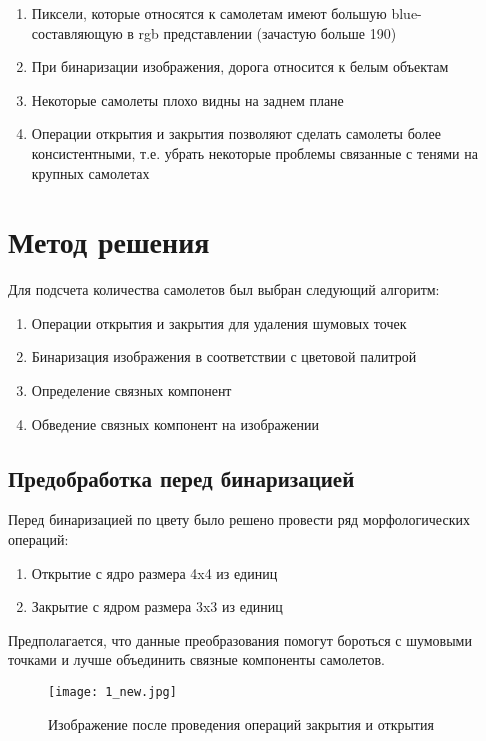 \documentclass{article}
\begin{document}
\begin{enumerate}
    \item Пиксели, которые относятся к самолетам имеют большую blue-составляющую в rgb представлении (зачастую больше 190)
    \item При бинаризации изображения, дорога относится к белым объектам
    \item Некоторые самолеты плохо видны на заднем плане
    \item Операции открытия и закрытия позволяют сделать самолеты более консистентными, т.е. убрать некоторые проблемы связанные с тенями на крупных самолетах
\end{enumerate}

\section{Метод решения}

Для подсчета количества самолетов был выбран следующий алгоритм:

\begin{enumerate}
    \item Операции открытия и закрытия для удаления шумовых точек
    \item Бинаризация изображения в соответствии с цветовой палитрой
    \item Определение связных компонент
    \item Обведение связных компонент на изображении
\end{enumerate}

\subsection{Предобработка перед бинаризацией}

Перед бинаризацией по цвету было решено провести ряд морфологических операций:

\begin{enumerate}
    \item Открытие с ядро размера 4x4 из единиц
    \item Закрытие с ядром размера 3x3 из единиц
\end{enumerate}

Предполагается, что данные преобразования помогут бороться с шумовыми точками и лучше объединить связные компоненты самолетов.

\begin{figure}[h!]
    \centering
    \texttt{[image: 1\_new.jpg]}
    \caption{Изображение после проведения операций закрытия и открытия}
    \label{fig:enter-label}
\end{figure}
\end{document}
